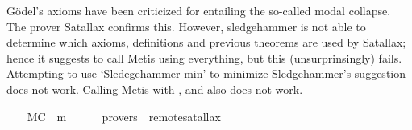 %
\begin{isabellebody}%
\def\isabellecontext{GoedelGodModalCollapse}%
%
\isadelimtheory
%
\endisadelimtheory
%
\isatagtheory
%
\endisatagtheory
{\isafoldtheory}%
%
\isadelimtheory
%
\endisadelimtheory
%
\isamarkuptrue%
%
\begin{isamarkuptext}%
G\"odel's axioms have been criticized for entailing the so-called 
modal collapse. The prover Satallax \cite{Satallax} confirms this. 
However, sledgehammer is not able to determine which axioms, 
definitions and previous theorems are used by Satallax;
hence it suggests to call Metis using everything, but this (unsurprinsingly) fails.
Attempting to use `Sledegehammer min' to minimize Sledgehammer's suggestion does not work.
Calling Metis with ,  and  also does not work.%
\end{isamarkuptext}%
\isamarkuptrue%
\ \ \isamarkupfalse%
\ MC{\isacharcolon}\ {\isachardoublequoteopen}{\isacharbrackleft}{\isasymforall}{\isacharparenleft}{\isasymlambda}{\isasymPhi}{\isachardot}{\isacharparenleft}{\isasymPhi}\ m{\isasymrightarrow}\ {\isacharparenleft}{\isasymbox}\ {\isasymPhi}{\isacharparenright}{\isacharparenright}{\isacharparenright}{\isacharbrackright}{\isachardoublequoteclose}\isanewline
\ \ \isamarkupfalse%
\ {\isacharbrackleft}provers\ {\isacharequal}\ remote{\isacharunderscore}satallax{\isacharbrackright}%
\isadelimproof
\ %
\endisadelimproof
%
\isatagproof
{}\isamarkupfalse%
\isanewline
\ \ \isanewline
\isanewline
%
\endisatagproof
{\isafoldproof}%
%
\isadelimproof
%
\endisadelimproof
%
\isadelimtheory
%
\endisadelimtheory
%
\isatagtheory
%
\endisatagtheory
{\isafoldtheory}%
%
\isadelimtheory
%
\endisadelimtheory
\end{isabellebody}%
